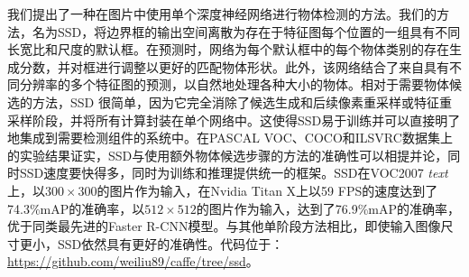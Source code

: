 \documentclass[../main.tex]{subfile}
\begin{document}
我们提出了一种在图片中使用单个深度神经网络进行物体检测的方法。我们的方法，名为SSD，将边界框的输出空间离散为存在于特征图每个位置的一组具有不同长宽比和尺度的默认框。在预测时，网络为每个默认框中的每个物体类别的存在生成分数，并对框进行调整以更好的匹配物体形状。此外，该网络结合了来自具有不同分辨率的多个特征图的预测，以自然地处理各种大小的物体。相对于需要物体候选的方法，SSD 很简单，因为它完全消除了候选生成和后续像素重采样或特征重采样阶段，并将所有计算封装在单个网络中。这使得SSD易于训练并可以直接明了地集成到需要检测组件的系统中。在PASCAL VOC、COCO和ILSVRC数据集上的实验结果证实，SSD与使用额外物体候选步骤的方法的准确性可以相提并论，同时SSD速度要快得多，同时为训练和推理提供统一的框架。SSD在VOC2007 \textit{text}上，以$300 \times 300$的图片作为输入，在Nvidia Titan X上以59 FPS的速度达到了74.3\%mAP的准确率，以$512 \times 512$的图片作为输入，达到了76.9\%mAP的准确率，优于同类最先进的Faster R-CNN模型。与其他单阶段方法相比，即使输入图像尺寸更小，SSD依然具有更好的准确性。代码位于：\href{https://github.com/weiliu89/caffe/tree/ssd}{https://github.com/weiliu89/caffe/tree/ssd}。
\end{document}
